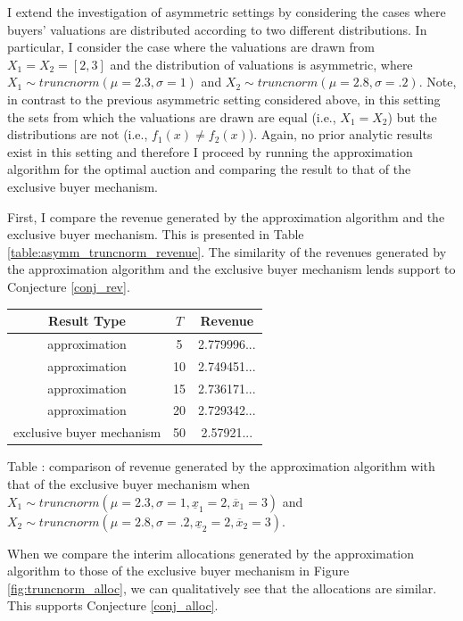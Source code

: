 I extend the investigation of asymmetric settings by considering the cases where buyers' valuations are distributed according to two different distributions. In particular, I consider the case where the valuations are drawn from $X_1 = X_2 = [2,3]$ and the distribution of valuations is asymmetric, where $X_1 \sim truncnorm(\mu=2.3, \sigma=1)$ and $X_2 \sim truncnorm(\mu=2.8, \sigma=.2)$. Note, in contrast to the previous asymmetric setting considered above, in this setting the sets from which the valuations are drawn are equal (i.e., $X_1 = X_2$) but the distributions are not (i.e., $f_1(x) \neq f_2(x)$). Again, no prior analytic results exist in this setting and therefore I proceed by running the approximation algorithm for the optimal auction and comparing the result to that of the exclusive buyer mechanism.

First, I compare the revenue generated by the approximation algorithm and the exclusive buyer mechanism. This is presented in Table \ref{table:asymm_truncnorm_revenue}. The similarity of the revenues generated by the approximation algorithm and the exclusive buyer mechanism lends support to Conjecture \ref{conj_rev}.

\begin{center}
    \begin{tabular}{ |c|c|c| } 
    \hline
    Result Type & $T$ & Revenue \\
    \hline
    \hline
    approximation & 5 & 2.779996... \\ 
    approximation & 10 & 2.749451... \\ 
    approximation & 15 & 2.736171... \\ 
    approximation & 20 & 2.729342... \\ 
    exclusive buyer mechanism & 50 & 2.57921... \\
    \hline
    \end{tabular}

    \vspace{1mm}
    \raggedright{\small {\sc Table \thefig\label{table:asymm_truncnorm_revenue}:} comparison of revenue generated by the approximation algorithm with that of the exclusive buyer mechanism when $X_1 \sim truncnorm(\mu=2.3, \sigma=1, \underline{x}_1=2, \overline{x}_1=3)$ and $X_2 \sim truncnorm(\mu=2.8, \sigma=.2, \underline{x}_2=2, \overline{x}_2=3)$.}
\end{center}

When we compare the interim allocations generated by the approximation algorithm to those of the exclusive buyer mechanism in Figure \ref{fig:truncnorm_alloc}, we can qualitatively see that the allocations are similar. This supports Conjecture \ref{conj_alloc}.

